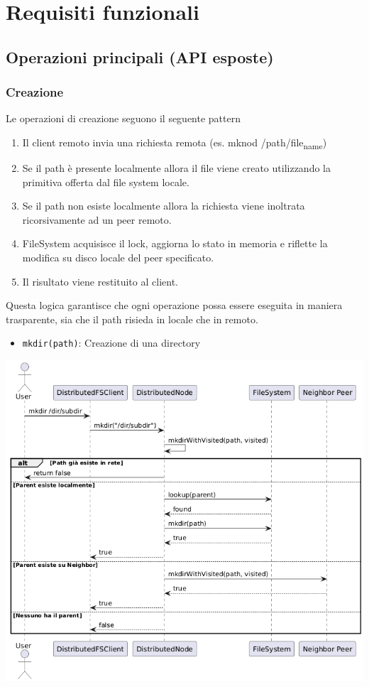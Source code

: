 \documentclass[11pt]{article}
\begin{document}
\section{Requisiti funzionali}
\label{sec:orgcd3e8ca}
\subsection{Operazioni principali (API esposte)}
\label{sec:org85c4a87}
\subsubsection{Creazione}
\label{sec:orgc82077a}
Le operazioni di creazione seguono il seguente pattern
\begin{enumerate}
\item Il client remoto invia una richiesta remota (es. mknod /path/file\textsubscript{name})
\item Se il path è presente localmente allora il file viene creato utilizzando la primitiva offerta dal file system locale.
\item Se il path non esiste localmente allora la richiesta viene inoltrata ricorsivamente ad un peer remoto.
\item FileSystem acquisisce il lock, aggiorna lo stato in memoria e riflette la modifica su disco locale del peer specificato.
\item Il risultato viene restituito al client.
\end{enumerate}
Questa logica garantisce che ogni operazione possa essere eseguita
in maniera trasparente, sia che il path risieda in locale che in remoto.
\begin{itemize}
\item \texttt{mkdir(path)}: Creazione di una  directory
\end{itemize}
\begin{center}
\includegraphics[width=.9\linewidth]{./img/mkdir.png}
\end{center}
\end{document}
